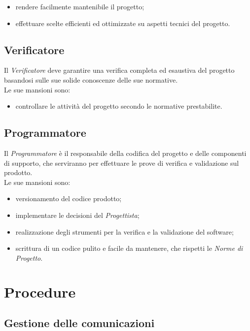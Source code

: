 \documentclass[./../NomeDocumento.tex]{subfiles}
\begin{document}
	\begin{itemize}
		\item rendere facilmente mantenibile il progetto;
		\item effettuare scelte efficienti ed ottimizzate su aspetti tecnici del progetto.
	\end{itemize}
	
	\subsection {Verificatore}
	
	Il \textit{Verificatore} deve garantire una verifica completa ed esaustiva del progetto basandosi sulle sue solide conoscenze delle sue normative.
	\\ \noindent Le sue mansioni sono:
	\begin{itemize}
		\item controllare le attività del progetto secondo le normative prestabilite.
	\end{itemize}
	
	\subsection {Programmatore}
	
	Il \textit{Programmatore} è il responsabile della codifica del progetto e delle componenti di supporto, che serviranno per effettuare le prove di verifica e validazione sul prodotto.
	\\ \noindent Le sue mansioni sono:
	
	\begin{itemize}
		\item versionamento del codice prodotto;
		\item implementare le decisioni del \textit{Progettista};
		\item realizzazione degli strumenti per la verifica e la validazione del software;
		\item scrittura di un codice pulito e facile da mantenere, che rispetti le \textit{Norme di Progetto}.
	\end{itemize}
	
	\section {Procedure}
	
	\subsection{Gestione delle comunicazioni}
	
\end{document}

